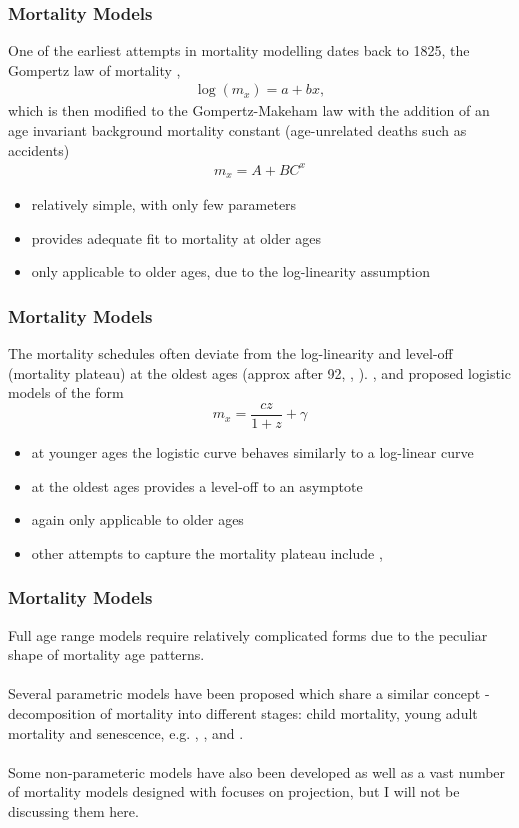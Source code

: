 \documentclass[hyperref={colorlinks, citecolor=blue}]{beamer}
\begin{document}
\begin{frame}
\frametitle{Mortality Models}
One of the earliest attempts in mortality modelling dates back to 1825, the Gompertz law of mortality \citep{gompertz1825on},
\begin{align*}
\log (m_x) = a + bx,
\end{align*}
which is then modified to the Gompertz-Makeham law \citep{makeham1860law} with the addition of an age invariant background mortality constant (age-unrelated deaths such as accidents)
\begin{align*}
m_x = A + BC^x
\end{align*}
\begin{itemize}
\item relatively simple, with only few parameters
\item provides adequate fit to mortality at older ages
\item only applicable to older ages, due to the log-linearity assumption
\end{itemize}
\end{frame}

\begin{frame}
\frametitle{Mortality Models}
The mortality schedules often deviate from the log-linearity and level-off (mortality plateau) at the oldest ages (approx after 92, \citeauthor{carriere1992parametric}, \citeyear{carriere1992parametric}). \citet{perks1932some}, \citet{beard1959note} and \citet{thatcher1999long} proposed logistic models of the form
\begin{equation*}
 m_x = \frac{c z}{1+z} + \gamma
	\end{equation*}
\begin{itemize}
\item at younger ages the logistic curve behaves similarly to a log-linear curve
\item at the oldest ages provides a level-off to an asymptote
\item again only applicable to older ages
\item other attempts to capture the mortality plateau include \citet{coale1990defects}, \citet{lindbergson2001mortality}
\end{itemize}
\end{frame}

\begin{frame}
\frametitle{Mortality Models}
Full age range models require relatively complicated forms due to the peculiar shape of mortality age patterns. 
\\~\\
Several parametric models have been proposed which share a similar concept - decomposition of mortality into different stages: child mortality, young adult mortality and senescence, e.g. \citet{thiele1871mathematical}, \citet{heligman1980age}, \citet{siler1983parameters} and \citet{carriere1992parametric}. 
\\~\\
Some non-parameteric models have also been developed as well as a vast number of mortality models designed with focuses on projection, but I will not be discussing them here.
\end{frame}
\end{document}
